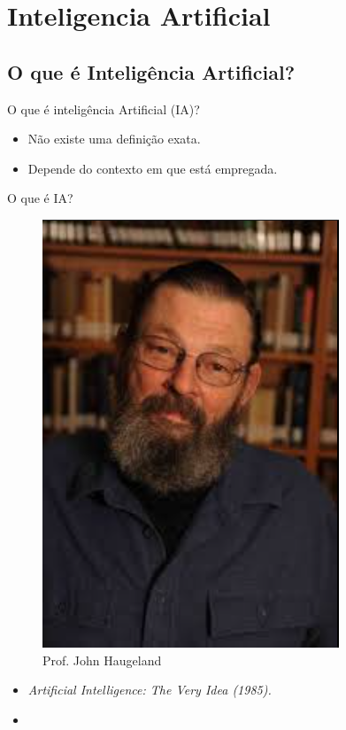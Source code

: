 \section{Inteligencia Artificial}
\subsection{O que é Inteligência Artificial?}
\begin{frame}{O que é inteligência Artificial (IA)?}
    \begin{block}{}
        \begin{itemize}
            \item Não existe uma definição exata.
            \item Depende do contexto em que está empregada.
        \end{itemize}
    \end{block}
\end{frame}
\begin{frame}{O que é IA?}
    \begin{minipage}{0.5\linewidth}
        \begin{figure}
            \centering
            \includegraphics[width=0.6\linewidth]{imagens//secao1/haugeland1985.png}
            \caption{Prof. John Haugeland}
        \end{figure}
    \end{minipage}
    \begin{minipage}{0.5\linewidth}
        \begin{itemize}
        \justifying
            \item \textit{Artificial Intelligence: The Very Idea (1985).}
            \item {}
        \end{itemize}
    \end{minipage}
\end{frame}

